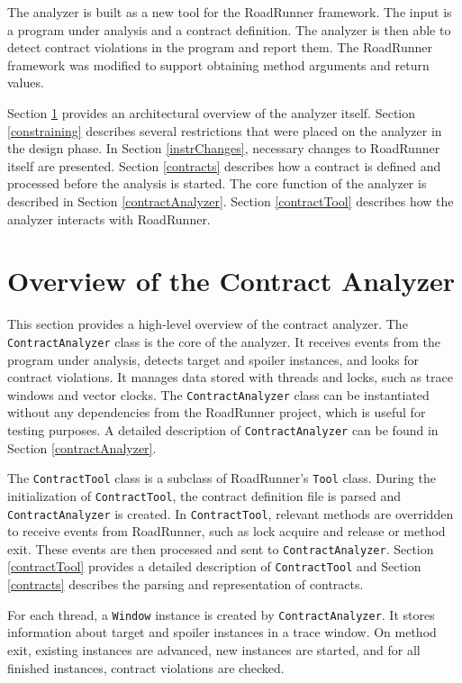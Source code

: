 The analyzer is built as a new tool for the RoadRunner framework. The input is a
program under analysis and a contract definition. The analyzer is then able to
detect contract violations in the program and report them. The RoadRunner
framework was modified to support obtaining method arguments and return values.

Section \ref{overview} provides an architectural overview of the analyzer
itself. Section \ref{constraining} describes several restrictions that were
placed on the analyzer in the design phase. In Section \ref{instrChanges},
necessary changes to RoadRunner itself are presented. Section \ref{contracts}
describes how a contract is defined and processed before the analysis is
started. The core function of the analyzer is described in Section
\ref{contractAnalyzer}. Section \ref{contractTool} describes how the analyzer
interacts with RoadRunner.

\section{Overview of the Contract Analyzer}
\label{overview}

This section provides a high-level overview of the contract analyzer. The
\texttt{ContractAnalyzer} class is the core of the analyzer. It receives events
from the program under analysis, detects target and spoiler instances, and looks
for contract violations. It manages data stored with threads and locks, such as
trace windows and vector clocks. The \texttt{ContractAnalyzer} class can be
instantiated without any dependencies from the RoadRunner project, which is
useful for testing purposes. A detailed description of \texttt{ContractAnalyzer}
can be found in Section \ref{contractAnalyzer}.

The \texttt{ContractTool} class is a subclass of RoadRunner's \texttt{Tool}
class. During the initialization of \texttt{ContractTool}, the contract
definition file is parsed and \texttt{ContractAnalyzer} is created. In
\texttt{ContractTool}, relevant methods are overridden to receive events from
RoadRunner, such as lock acquire and release or method exit. These events are
then processed and sent to \texttt{ContractAnalyzer}. Section \ref{contractTool}
provides a detailed description of \texttt{ContractTool} and Section
\ref{contracts} describes the parsing and representation of contracts.

For each thread, a \texttt{Window} instance is created by
\texttt{ContractAnalyzer}. It stores information about target and spoiler
instances in a trace window. On method exit, existing instances are advanced,
new instances are started, and for all finished instances, contract violations
are checked.

